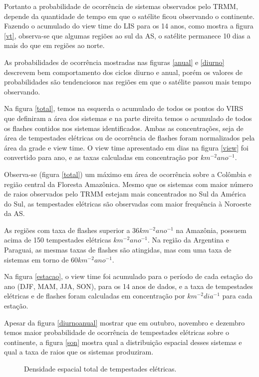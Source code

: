 Portanto a probabilidade de ocorrência de sistemas observados pelo TRMM, depende da quantidade de tempo em que o satélite ficou observando o continente. Fazendo o acumulado do view time do LIS para os 14 anos, como mostra a figura \ref{vt}, observa-se que algumas regiões ao sul da AS, o satélite permanece 10 dias a mais do que em regiões ao norte.

As probabilidades de ocorrência mostradas nas figuras \ref{anual} e \ref{diurno} descrevem bem comportamento dos ciclos diurno e anual, porém os valores de probabilidades são tendenciosos nas regiões em que o satélite passou mais tempo observando.

Na figura \ref{total}, temos na esquerda o acumulado de todos os pontos do VIRS que definiram a área dos sistemas e na parte direita temos o acumulado de todos os flashes contidos nos sistemas identificados. Ambas as concentrações, seja de área de tempestades elétricas ou de ocorrência de flashes foram normalizados pela área da grade e view time. O view time apresentado em dias na figura \ref{view} foi convertido para ano, e as taxas calculadas em concentração por $km^{-2}ano^{-1}$.

Observa-se (figura \ref{total}) um máximo em área de ocorrência sobre a Colômbia e região central da Floresta Amazônica. Mesmo que os sistemas com maior número de raios observados pelo TRMM estejam mais concentrados no Sul da América do Sul, as tempestades elétricas são observadas com maior frequência à Noroeste da AS. 

As regiões com taxa de flashes superior a 36$km^{-2}ano^{-1}$ na Amazônia, possuem acima de 150 tempestades elétricas $km^{-2}ano^{-1}$. Na região da Argentina e Paraguai, as mesmas taxas de flashes são atingidas, mas com uma taxa de sistemas em torno de 60$km^{-2}ano^{-1}$.  

Na figura \ref{estacao}, o view time foi acumulado para o período de cada estação do ano (DJF, MAM, JJA, SON), para os 14 anos de dados, e a taxa de tempestades elétricas e de flashes foram calculadas em concentração por $km^{-2}dia^{-1}$ para cada estação. 

Apesar da figura \ref{diurnoanual} mostrar que em outubro, novembro e dezembro temos maior probabilidade de ocorrência de tempestades elétricas sobre o continente, a figura \ref{son} mostra qual a distribuição espacial desses sistemas e qual a taxa de raios que os sistemas produziram. 


\begin{figure}
\caption{Densidade espacial total de tempestades elétricas.}
\label{tempestadesTotal}
\end{figure}


